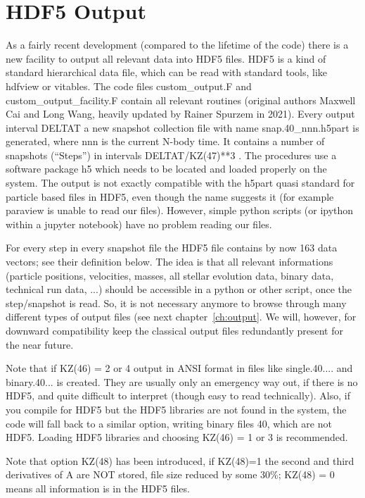 \section{HDF5 Output}

\label{ch:hdf5}

As a fairly recent development (compared to the lifetime of the code) there is a new facility to output all relevant data into HDF5 files. HDF5 is a kind of standard hierarchical data file, which can be read with standard tools, like hdfview or vitables. The code files custom\_output.F and custom\_output\_facility.F contain all relevant routines (original authors Maxwell Cai and Long Wang, heavily updated by Rainer Spurzem in 2021). Every output interval DELTAT a new snapshot collection file with name snap.40\_nnn.h5part is generated, where nnn is the current N-body time. It contains a number of snapshots (``Steps'') in intervals DELTAT/KZ(47)**3 . The procedures use a software package h5 which needs to be located and loaded properly on the system. The output is not exactly compatible with the h5part quasi standard for particle based files in HDF5, even though the name suggests it (for example paraview is unable to read our files). However, simple python scripts (or ipython within a jupyter notebook) have no problem reading our files. 

For every step in every snapshot file the HDF5 file contains by now 163 data vectors; see their definition below. The idea is that all relevant informations (particle positions, velocities, masses, all stellar evolution data, binary data, technical run data, ...) should be accessible in a python or other script, once the step/snapshot is read. So, it is not necessary anymore to browse through many different types of output files (see next chapter~\ref{ch:output}. We will, however, for downward compatibility keep the classical output files redundantly present for the near future.

Note that if KZ(46) = 2 or 4 output in ANSI format in files like single.40.... and binary.40... is created. They are usually only an emergency way out, if there is no HDF5, and quite difficult to interpret (though easy to read technically). Also, if you compile for HDF5 but the HDF5 libraries are not found in the system, the code will fall back to a similar option, writing binary files 40, which are not HDF5. Loading HDF5 libraries and choosing KZ(46) = 1 or 3 is recommended.

Note that option KZ(48) has been introduced, if KZ(48)=1 the second and third derivatives of A are NOT stored, file size reduced by some 30\%; KZ(48) = 0 means all information is in the HDF5 files. 

